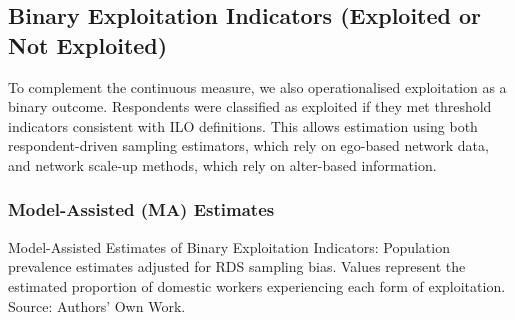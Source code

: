 \documentclass[
  12pt,
  letterpaper,
  DIV=11,
  numbers=noendperiod]{scrartcl}
\theoremstyle{plain}
\theoremstyle{definition}
\begin{document}
\subsection{Binary Exploitation Indicators (Exploited or Not
Exploited)}\label{binary-exploitation-indicators-exploited-or-not-exploited}

To complement the continuous measure, we also operationalised
exploitation as a binary outcome. Respondents were classified as
exploited if they met threshold indicators consistent with ILO
definitions. This allows estimation using both respondent-driven
sampling estimators, which rely on ego-based network data, and network
scale-up methods, which rely on alter-based information.

\subsubsection{Model-Assisted (MA)
Estimates}\label{model-assisted-ma-estimates}

\begin{table}

\caption{\label{tbl-ma-binary-indicators}Model-Assisted Estimates of
Binary Exploitation Indicators: Population prevalence estimates adjusted
for RDS sampling bias. Values represent the estimated proportion of
domestic workers experiencing each form of exploitation. Source:
Authors' Own Work.}


\end{table}%
\end{document}
